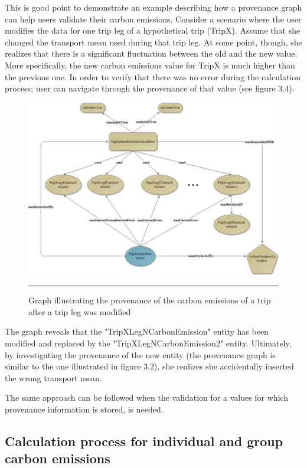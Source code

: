 This is good point to demonstrate an example describing how a provenance graph can help users validate their carbon emissions. Consider a scenario where the user modifies the data for one trip leg of a hypothetical trip (TripX). Assume that she changed the transport mean used during that trip leg. At some point, though, she realizes that there is a significant fluctuation between the old and the new value. More specifically, the new carbon emissions value for TripX is much higher than the previous one. In order to verify that there was no error during the calculation process; user can navigate through the provenance of that value (see figure 3.4).


\begin{figure}[htbp]
	\centering
		\includegraphics[scale=0.40]{./Figures/chapter3/figure4.pdf}
		\rule{35em}{0.5pt}
	\caption[Graph illustrating the provenance of the carbon emissions of a trip after a trip leg was modified]{Graph illustrating the provenance of the carbon emissions of a trip after a trip leg was modified}
	\label{fig:provTripCo2GraphRevision}
\end{figure}

The graph reveals that the "TripXLegNCarbonEmission" entity has been modified and replaced by the "TripXLegNCarbonEmission2" entity. Ultimately, by investigating the provenance of the new entity (the provenance graph is similar to the one illustrated in figure 3.2), she realizes she accidentally inserted the wrong transport mean.

The same approach can be followed when the validation for a values for which provenance information is stored, is needed.


\subsection{Calculation process for individual and group carbon emissions}


